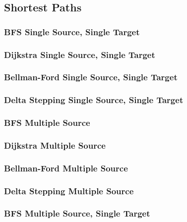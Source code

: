 


\subsection{Shortest Paths}
\subsubsection{BFS Single Source, Single Target}
\subsubsection{Dijkstra Single Source, Single Target}
\subsubsection{Bellman-Ford Single Source, Single Target}
\subsubsection{Delta Stepping Single Source, Single Target}

\subsubsection{BFS Multiple Source}
\subsubsection{Dijkstra Multiple Source}
\subsubsection{Bellman-Ford Multiple Source}
\subsubsection{Delta Stepping Multiple Source}

\subsubsection{BFS Multiple Source, Single Target}
